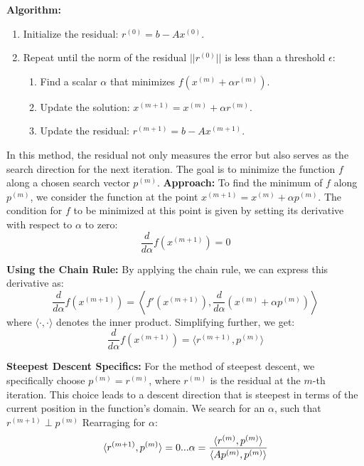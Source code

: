 \documentclass[unicode,11pt,a4paper,oneside,numbers=endperiod,openany]{scrartcl}
\begin{document}
\textbf{Algorithm:}
\begin{enumerate}
    \item Initialize the residual: \( r^{(0)} = b - Ax^{(0)} \).

    \item Repeat until the norm of the residual \( ||r^{(0)}|| \) is less than a threshold \( \epsilon \):
    \begin{enumerate}
        \item Find a scalar \( \alpha \) that minimizes \( f(x^{(m)} + \alpha r^{(m)}) \).

        \item Update the solution: \( x^{(m+1)} = x^{(m)} + \alpha r^{(m)} \).

        \item Update the residual: \( r^{(m+1)} = b - Ax^{(m+1)} \).
    \end{enumerate}
\end{enumerate}

In this method, the residual not only measures the error but also serves as the search direction for the next iteration.
\newline \newline
The goal is to minimize the function \( f \) along a chosen search vector \( p^{(m)} \).
\newline
\textbf{Approach:}
To find the minimum of \( f \) along \( p^{(m)} \), we consider the function at the point \( x^{(m+1)} = x^{(m)} + \alpha p^{(m)} \). The condition for \( f \) to be minimized at this point is given by setting its derivative with respect to \( \alpha \) to zero:
\[
\frac{d}{d\alpha} f(x^{(m+1)}) = 0
\]

\textbf{Using the Chain Rule:}
By applying the chain rule, we can express this derivative as:
\[
\frac{d}{d\alpha} f(x^{(m+1)}) = \left\langle f'(x^{(m+1)}), \frac{d}{d\alpha}(x^{(m)} + \alpha p^{(m)}) \right\rangle
\]
where \( \langle \cdot, \cdot \rangle \) denotes the inner product. Simplifying further, we get:
\[
\frac{d}{d\alpha} f(x^{(m+1)}) = \langle r^{(m+1)}, p^{(m)} \rangle
\]

\textbf{Steepest Descent Specifics:}
For the method of steepest descent, we specifically choose \( p^{(m)} = r^{(m)} \), where \( r^{(m)} \) is the residual at the \( m \)-th iteration. This choice leads to a descent direction that is steepest in terms of the current position in the function's domain.
\newline
We search for an $\alpha$, such that $r^{(m+1)} \perp p^{(m)}$ \newline
Rearraging for $\alpha$:\newline
\[
 \langle r^{(m+1)}, p^{(m)} \rangle = 0 \newline
 ... \newline
 \alpha = \frac{\langle r^{(m)}, p^{(m)} \rangle}{\langle Ap^{(m)}, p^{(m)} \rangle}
\]
\newline
\end{document}
